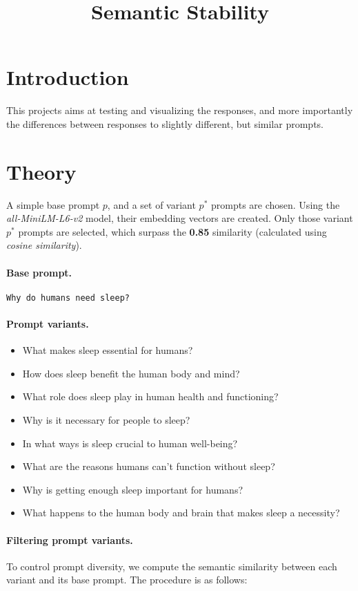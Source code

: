 \documentclass{article}
\title{Semantic Stability}
\begin{document}
\maketitle

\section{Introduction}
This projects aims at testing and visualizing the responses, and more importantly the differences between responses to slightly different, but similar prompts.

\section{Theory}
A simple base prompt $p$, and a set of variant $p^*$ prompts are chosen. Using the \textit{all-MiniLM-L6-v2} model, their embedding vectors are created. Only those variant $p^*$ prompts are selected, which surpass the \textbf{0.85} similarity (calculated using \textit{cosine similarity}).

\paragraph{Base prompt.}
\texttt{Why do humans need sleep?}

\paragraph{Prompt variants.}
\begin{itemize}
    \item What makes sleep essential for humans?
    \item How does sleep benefit the human body and mind?
    \item What role does sleep play in human health and functioning?
    \item Why is it necessary for people to sleep?
    \item In what ways is sleep crucial to human well-being?
    \item What are the reasons humans can't function without sleep?
    \item Why is getting enough sleep important for humans?
    \item What happens to the human body and brain that makes sleep a necessity?
\end{itemize}

\paragraph{Filtering prompt variants.}
To control prompt diversity, we compute the semantic similarity between each variant and its base prompt.
The procedure is as follows:
\end{document}
